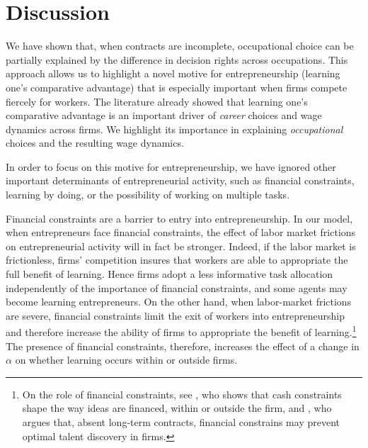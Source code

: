 \documentclass[12pt,american]{paper}
\theoremstyle{remark}
\begin{document}







\section{Discussion}\label{conclusion}
%
We have shown that, when contracts are incomplete, occupational choice can be partially explained by the difference in decision rights across occupations. This approach allows us to highlight a novel motive for entrepreneurship (learning one's comparative advantage) that is especially important when firms compete fiercely for workers. The literature already showed  that learning one's comparative advantage is an important driver of \textit{career} choices and wage dynamics across firms. We highlight its importance in explaining \textit{occupational} choices and the resulting wage dynamics.

In order to focus on this motive for entrepreneurship, we have ignored other important determinants of entrepreneurial activity, such as financial constraints, learning by doing, or the possibility of working on multiple tasks. 

Financial constraints are a barrier to entry into entrepreneurship. In our model, when entrepreneurs face financial constraints, the effect of labor market frictions on entrepreneurial activity will in fact be stronger. Indeed, if the labor market is frictionless, firms' competition insures that workers are able to appropriate the full benefit of learning.  Hence firms adopt a less informative task allocation independently of the importance of financial constraints, and some agents may become learning entrepreneurs. On the other hand, when labor-market frictions are severe, financial constraints limit the exit of workers into entrepreneurship and therefore increase the ability of firms to appropriate the benefit of learning.\footnote{On the role of financial constraints, see \citet{Hellmann:2007tk}, who shows that cash constraints shape the way ideas are financed, within or outside the firm, and \citet{tervio_superstars_2009}, who argues that, absent long-term contracts, financial constrains may prevent optimal talent discovery in firms.}  The presence of financial constraints, therefore, increases the effect of a change in $\alpha$ on whether learning occurs within or outside firms.
\end{document}

